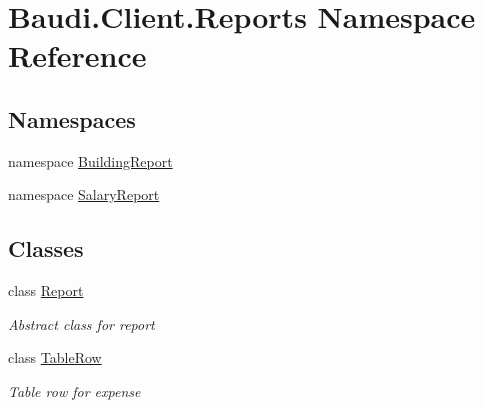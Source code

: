 \hypertarget{namespace_baudi_1_1_client_1_1_reports}{}\section{Baudi.\+Client.\+Reports Namespace Reference}
\label{namespace_baudi_1_1_client_1_1_reports}
\subsection*{Namespaces}
\begin{DoxyCompactItemize}
\item 
namespace \hyperlink{namespace_baudi_1_1_client_1_1_reports_1_1_building_report}{Building\+Report}
\item 
namespace \hyperlink{namespace_baudi_1_1_client_1_1_reports_1_1_salary_report}{Salary\+Report}
\end{DoxyCompactItemize}
\subsection*{Classes}
\begin{DoxyCompactItemize}
\item 
class \hyperlink{class_baudi_1_1_client_1_1_reports_1_1_report}{Report}
\begin{DoxyCompactList}\small\item\em Abstract class for report \end{DoxyCompactList}\item 
class \hyperlink{class_baudi_1_1_client_1_1_reports_1_1_table_row}{Table\+Row}
\begin{DoxyCompactList}\small\item\em Table row for expense \end{DoxyCompactList}\end{DoxyCompactItemize}
